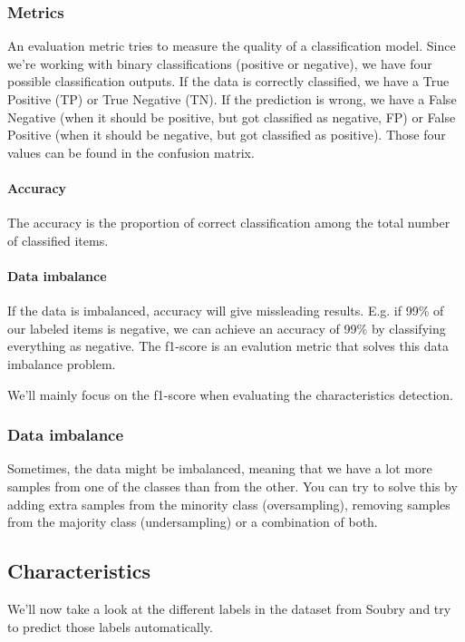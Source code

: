 \documentclass{article}
\begin{document}
\subsubsection{Metrics}
An evaluation metric tries to measure the quality of a classification model. Since we're working with binary classifications (positive or negative), we have four possible classification outputs. If the data is correctly classified, we have a True Positive (TP) or True Negative (TN). If the prediction is wrong, we have a False Negative (when it should be positive, but got classified as negative, FP) or False Positive (when it should be negative, but got classified as positive). Those four values can be found in the confusion matrix. \cite{agarwal_2019}

\paragraph{Accuracy}
The accuracy is the proportion of correct classification among the total number of classified items. \cite{agarwal_2019}

\paragraph{Data imbalance} If the data is imbalanced, accuracy will give missleading results. E.g. if 99\% of our labeled items is negative, we can achieve an accuracy of 99\% by classifying everything as negative. The f1-score is an evalution metric that solves this data imbalance problem.

We'll mainly focus on the f1-score when evaluating the characteristics detection.

\subsubsection{Data imbalance}
Sometimes, the data might be imbalanced, meaning that we have a lot more samples from one of the classes than from the other. You can try to solve this by adding extra samples from the minority class (oversampling), removing samples from the majority class (undersampling) or a combination of both.

\subsection{Characteristics}
We'll now take a look at the different labels in the dataset from Soubry \cite{soubry} and try to predict those labels automatically.
\end{document}
